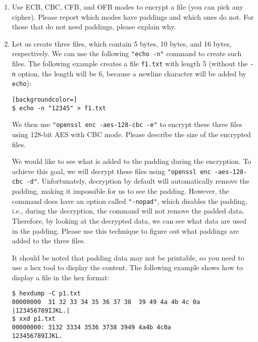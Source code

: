 \begin{enumerate}
\item Use ECB, CBC, CFB, and OFB modes to encrypt a file (you can pick
any cipher).  Please report which modes have paddings and which ones
do not. For those that do not need paddings, please explain why.


\item Let us create three files, which contain 5 bytes, 10 bytes, and 16 bytes, respectively.
We can use the following \texttt{"echo -n"} command to create such files. The following example
creates a file \texttt{f1.txt} with length 5 (without the \texttt{-n} option, the length will
be 6, because a newline character will be added by \texttt{echo}):

\begin{lstlisting}[backgroundcolor=]
$ echo -n "12345" > f1.txt
\end{lstlisting}

We then use \texttt{"openssl enc -aes-128-cbc -e"} to encrypt these three files using
128-bit AES with CBC mode.  Please describe
the size of the encrypted files.

We would like to see what is added to the padding during the encryption. To achieve
this goal, we will decrypt these files using \texttt{"openssl enc -aes-128-cbc -d"}.
Unfortunately, decryption by default will automatically remove the padding, making it
impossible for us to see the padding. However, the command does have an option called
\texttt{"-nopad"}, which disables the padding, i.e., during the decryption, the command will not
remove the padded data. Therefore, by looking at the decrypted
data, we can see what data are used in the padding.
Please use this technique to figure out what paddings are added to the three files.

It should be noted that padding data may not be printable, so you need to
use a hex tool to display the content. The following example shows
how to display a file in the hex format:

\begin{lstlisting}
$ hexdump -C p1.txt
00000000  31 32 33 34 35 36 37 38  39 49 4a 4b 4c 0a   |123456789IJKL.|
$ xxd p1.txt
00000000: 3132 3334 3536 3738 3949 4a4b 4c0a            123456789IJKL.
\end{lstlisting}

\end{enumerate}



